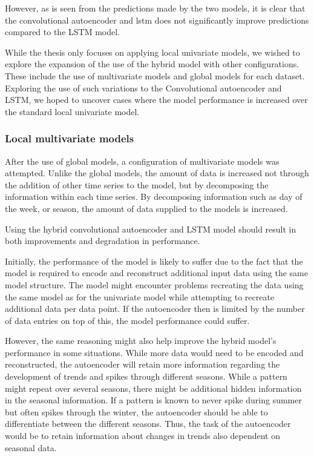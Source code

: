 However, as is seen from the predictions made by the two models, it is clear that the convolutional autoencoder and lstm
does not significantly improve predictions compared to the LSTM model.


While the thesis \cite{Zhao2019} only focuses on applying local univariate models,
we wished to explore the expansion of the use of the hybrid model with other configurations.
These include the use of multivariate models and global models for each dataset.
Exploring the use of such variations to the Convolutional autoencoder and LSTM,
we hoped to uncover cases where the model performance is increased over the standard local univariate model.

\subsubsection{Local multivariate models}

After the use of global models, a configuration of multivariate models was attempted.
Unlike the global models, the amount of data is increased not through the addition of other time series to the model,
but by decomposing the information within each time series.
By decomposing information such as day of the week, or season, the amount of data supplied to the models is increased.


Using the hybrid convolutional autoencoder and LSTM model should result in both improvements and degradation in performance.

Initially, the performance of the model is likely to suffer due to the fact that
the model is required to encode and reconstruct additional input data using the same model structure.
The model might encounter problems recreating the data using the same model as for the univariate model
while attempting to recreate additional data per data point.
If the autoencoder then is limited by the number of data entries on top of this, the model performance could suffer.

However, the same reasoning might also help improve the hybrid model's performance in some situations.
While more data would need to be encoded and reconstructed, the autoencoder will retain more information
regarding the development of trends and spikes through different seasons.
% 
While a pattern might repeat over several seasons, there might be additional hidden information in the seasonal information.
If a pattern is known to never spike during summer but often spikes through the winter,
the autoencoder should be able to differentiate between the different seasons.
Thus, the task of the autoencoder would be to retain information about changes in trends also dependent on seasonal data.


